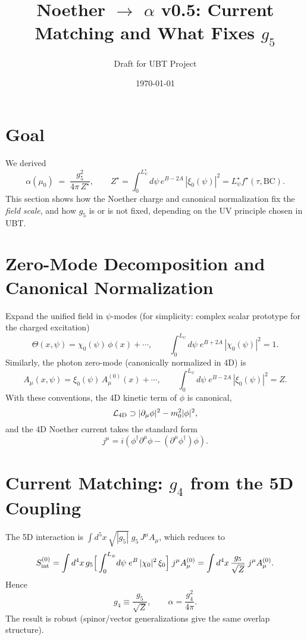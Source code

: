 \documentclass[12pt]{article}
\title{Noether $\to$ $\alpha$ v0.5: Current Matching and What Fixes $g_5$}
\author{Draft for UBT Project}
\date{\today}
\begin{document}
\maketitle

\section{Goal}
We derived
\begin{equation}
\alpha(\mu_0) \;=\; \frac{g_5^2}{4\pi\, Z^\star}, 
\qquad 
Z^\star = \int_0^{L_\psi^\star}\! d\psi\, e^{B-2A}\,|\xi_0(\psi)|^2
= L_\psi^\star f^\star(\tau,\mathrm{BC}).
\end{equation}
This section shows how the Noether charge and canonical normalization fix the \emph{field scale}, and how $g_5$ is or is not fixed, depending on the UV principle chosen in UBT.

\section{Zero-Mode Decomposition and Canonical Normalization}
Expand the unified field in $\psi$-modes (for simplicity: complex scalar prototype for the charged excitation)
\begin{equation}
\Theta(x,\psi) = \chi_0(\psi)\,\phi(x) + \cdots, 
\qquad 
\int_0^{L_\psi}\! d\psi\; e^{B+2A}\, |\chi_0(\psi)|^2 = 1.
\end{equation}
Similarly, the photon zero-mode (canonically normalized in 4D) is
\begin{equation}
A_\mu(x,\psi) = \xi_0(\psi)\, A_\mu^{(0)}(x) + \cdots, 
\qquad 
\int_0^{L_\psi}\! d\psi\; e^{B-2A}\, |\xi_0(\psi)|^2 = Z.
\end{equation}
With these conventions, the 4D kinetic term of $\phi$ is canonical,
\begin{equation}
\mathcal L_{\rm 4D} \supset |\partial_\mu \phi|^2 - m_0^2 |\phi|^2,
\end{equation}
and the 4D Noether current takes the standard form
\begin{equation}
j^\mu = i \left(\phi^\dagger \partial^\mu \phi - (\partial^\mu \phi^\dagger)\phi\right).
\end{equation}

\section{Current Matching: $g_4$ from the 5D Coupling}
The 5D interaction is $\int d^5x\,\sqrt{|g_5|}\; g_5\, J^\mu A_\mu$, which reduces to
\begin{equation}
S_{\rm int}^{(0)} = \int d^4x\, g_5 
\Big[\int_0^{L_\psi}\! d\psi\; e^{B}\, |\chi_0|^2\, \xi_0 \Big]\; j^\mu A_\mu^{(0)}
= \int d^4x\, \frac{g_5}{\sqrt{Z}}\; j^\mu A_\mu^{(0)}.
\end{equation}
Hence
\begin{equation}
g_4 \equiv \frac{g_5}{\sqrt{Z}}, \qquad \alpha = \frac{g_4^2}{4\pi}.
\end{equation}
The result is robust (spinor/vector generalizations give the same overlap structure).
\end{document}
